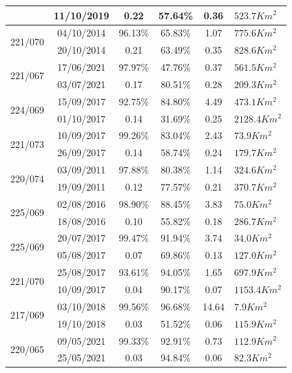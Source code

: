 \documentclass[cic,tc]{iiufrgs}
\begin{document}
\begin{table}[htbp]
\begin{tabular}{cccccl}
                         & 11/10/2019 & 0.22 & 57.64\% & 0.36 & $523.7Km^2$ \\
\hline
\multirow{2}{*}{221/070} & 04/10/2014 & 96.13\% & 65.83\% & 1.07 & $775.6Km^2$ \\
                         & 20/10/2014 & 0.21 & 63.49\% & 0.35 & $828.6Km^2$ \\
\hline
\multirow{2}{*}{221/067} & 17/06/2021 & 97.97\% & 47.76\% & 0.37 & $561.5Km^2$ \\
                         & 03/07/2021 & 0.17 & 80.51\% & 0.28 & $209.3Km^2$ \\
\hline
\multirow{2}{*}{224/069} & 15/09/2017 & 92.75\% & 84.80\% & 4.49 & $473.1Km^2$ \\
                         & 01/10/2017 & 0.14 & 31.69\% & 0.25 & $2128.4Km^2$ \\
\hline
\multirow{2}{*}{221/073} & 10/09/2017 & 99.26\% & 83.04\% & 2.43 & $73.9Km^2$ \\
                         & 26/09/2017 & 0.14 & 58.74\% & 0.24 & $179.7Km^2$ \\
\hline
\multirow{2}{*}{220/074} & 03/09/2011 & 97.88\% & 80.38\% & 1.14 & $324.6Km^2$ \\
                         & 19/09/2011 & 0.12 & 77.57\% & 0.21 & $370.7Km^2$ \\
\hline
\multirow{2}{*}{225/069} & 02/08/2016 & 98.90\% & 88.45\% & 3.83 & $75.0Km^2$ \\
                         & 18/08/2016 & 0.10 & 55.82\% & 0.18 & $286.7Km^2$ \\
\hline
\multirow{2}{*}{225/069} & 20/07/2017 & 99.47\% & 91.94\% & 3.74 & $34.0Km^2$ \\
                         & 05/08/2017 & 0.07 & 69.86\% & 0.13 & $127.0Km^2$ \\
\hline
\multirow{2}{*}{221/070} & 25/08/2017 & 93.61\% & 94.05\% & 1.65 & $697.9Km^2$ \\
                         & 10/09/2017 & 0.04 & 90.17\% & 0.07 & $1153.4Km^2$ \\
\hline
\multirow{2}{*}{217/069} & 03/10/2018 & 99.56\% & 96.68\% & 14.64 & $7.9Km^2$ \\
                         & 19/10/2018 & 0.03 & 51.52\% & 0.06 & $115.9Km^2$ \\
\hline
\multirow{2}{*}{220/065} & 09/05/2021 & 99.33\% & 92.91\% & 0.73 & $112.9Km^2$ \\
                         & 25/05/2021 & 0.03 & 94.84\% & 0.06 & $82.3Km^2$ \\
\hline

\end{tabular}
\end{table}
\end{document}
